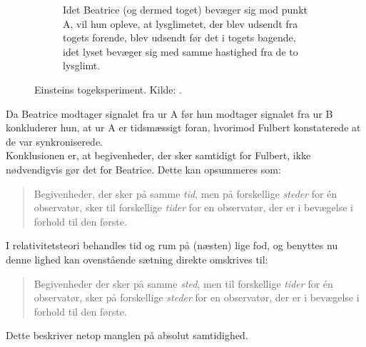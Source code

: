 \begin{figure}[t]
\begin{subfigure}[t]{.3\textwidth}
        \caption{Idet Beatrice (og dermed toget) bevæger sig mod punkt A, vil hun opleve, at lysglimetet, der blev udsendt fra togets forende, blev udsendt før det i togets bagende, idet lyset bevæger sig med samme hastighed fra de to lysglimt.}
        \label{fig:EinsteinsTrainExperiment3}
    \end{subfigure}
    \caption{Einsteins togeksperiment. Kilde: \cite{uggerhojSpecielRelativitetsteori2016}.}
    \label{fig:EinsteinsTrainExperiment}
\end{figure}
%
Da Beatrice modtager signalet fra ur A før hun modtager signalet fra ur B
konkluderer hun, at ur A er tidsmæssigt foran, hvorimod Fulbert konstaterede at de var synkroniserede. \\
Konklusionen er, at begivenheder, der sker samtidigt for Fulbert, ikke nødvendigvis gør det for Beatrice. Dette kan opsummeres som:
\begin{quote}
	Begivenheder, der sker på samme \textit{tid}, men på forskellige \textit{steder} for én observatør, sker til forskellige \textit{tider} for en observatør, der er i bevægelse i forhold til den første.
\end{quote}
I relativitetsteori behandles tid og rum på (næsten) lige fod, og benyttes nu denne lighed kan ovenstående sætning direkte omskrives til:
\begin{quote}
	Begivenheder der sker på samme \textit{sted}, men til forskellige \textit{tider} for én observatør, sker på forskellige \textit{steder} for en observatør, der er i bevægelse i forhold til den første.
\end{quote}
Dette beskriver netop manglen på absolut samtidighed.